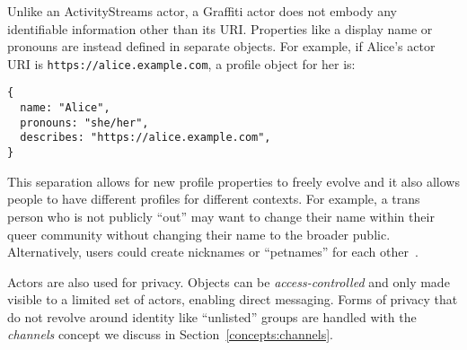 
Unlike an ActivityStreams actor, a Graffiti actor does not embody 
any identifiable information other than its
URI.
Properties like a display name or pronouns are instead
defined in separate objects.
For example, if Alice's actor URI is
\texttt{https://\allowbreak{}alice.\allowbreak{}example.\allowbreak{}com}, a profile object for her is:
\begin{verbatim}
{
  name: "Alice",
  pronouns: "she/her",
  describes: "https://alice.example.com",
}
\end{verbatim}

This separation allows for new profile
properties to freely evolve
and it also allows people to have different profiles for different contexts.
For example, a trans person who is not publicly ``out'' may want to
change their name within their queer community without
changing their name to the broader public.
Alternatively, users could create nicknames
or ``petnames'' for each other~\cite{petnames}.

Actors are also used for privacy.
Objects can be \emph{access-controlled} and only
made visible to a limited set of actors, enabling
direct messaging.
Forms of privacy that do not revolve around identity
like ``unlisted'' groups are handled
with the \emph{channels} concept we discuss in
Section~\ref{concepts:channels}.

